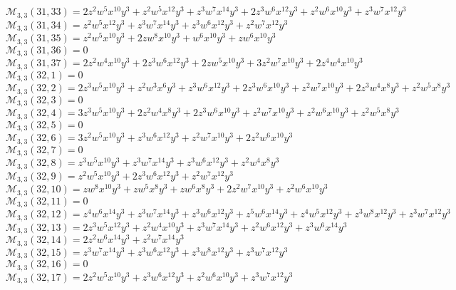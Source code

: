 $\mathcal{M}_{3,3}(31,33)=2z^2w^5x^{10}y^3+z^2w^5x^{12}y^3+z^3w^7x^{14}y^3+2z^3w^6x^{12}y^3+z^2w^6x^{10}y^3+z^3w^7x^{12}y^3$\\
$\mathcal{M}_{3,3}(31,34)=z^2w^5x^{12}y^3+z^3w^7x^{14}y^3+z^3w^6x^{12}y^3+z^2w^7x^{12}y^3$\\
$\mathcal{M}_{3,3}(31,35)=z^2w^5x^{10}y^3+2zw^8x^{10}y^3+w^6x^{10}y^3+zw^6x^{10}y^3$\\
$\mathcal{M}_{3,3}(31,36)=0$\\
$\mathcal{M}_{3,3}(31,37)=2z^2w^4x^{10}y^3+2z^3w^6x^{12}y^3+2zw^5x^{10}y^3+3z^2w^7x^{10}y^3+2z^4w^4x^{10}y^3$\\
$\mathcal{M}_{3,3}(32,1)=0$\\
$\mathcal{M}_{3,3}(32,2)=2z^3w^5x^{10}y^3+z^2w^3x^6y^3+z^3w^6x^{12}y^3+2z^3w^6x^{10}y^3+z^2w^7x^{10}y^3+2z^3w^4x^8y^3+z^2w^5x^8y^3$\\
$\mathcal{M}_{3,3}(32,3)=0$\\
$\mathcal{M}_{3,3}(32,4)=3z^3w^5x^{10}y^3+2z^2w^4x^8y^3+2z^3w^6x^{10}y^3+z^2w^7x^{10}y^3+z^2w^6x^{10}y^3+z^2w^5x^8y^3$\\
$\mathcal{M}_{3,3}(32,5)=0$\\
$\mathcal{M}_{3,3}(32,6)=3z^2w^5x^{10}y^3+z^3w^6x^{12}y^3+z^2w^7x^{10}y^3+2z^2w^6x^{10}y^3$\\
$\mathcal{M}_{3,3}(32,7)=0$\\
$\mathcal{M}_{3,3}(32,8)=z^3w^5x^{10}y^3+z^3w^7x^{14}y^3+z^3w^6x^{12}y^3+z^2w^4x^8y^3$\\
$\mathcal{M}_{3,3}(32,9)=z^2w^5x^{10}y^3+2z^3w^6x^{12}y^3+z^2w^7x^{12}y^3$\\
$\mathcal{M}_{3,3}(32,10)=zw^8x^{10}y^3+zw^5x^8y^3+zw^6x^8y^3+2z^2w^7x^{10}y^3+z^2w^6x^{10}y^3$\\
$\mathcal{M}_{3,3}(32,11)=0$\\
$\mathcal{M}_{3,3}(32,12)=z^4w^6x^{14}y^3+z^3w^7x^{14}y^3+z^3w^6x^{12}y^3+z^5w^6x^{14}y^3+z^4w^5x^{12}y^3+z^3w^8x^{12}y^3+z^3w^7x^{12}y^3$\\
$\mathcal{M}_{3,3}(32,13)=2z^3w^5x^{12}y^3+z^2w^4x^{10}y^3+z^3w^7x^{14}y^3+z^2w^6x^{12}y^3+z^3w^6x^{14}y^3$\\
$\mathcal{M}_{3,3}(32,14)=2z^2w^6x^{14}y^3+z^2w^7x^{14}y^3$\\
$\mathcal{M}_{3,3}(32,15)=z^3w^7x^{14}y^3+z^3w^6x^{12}y^3+z^3w^8x^{12}y^3+z^3w^7x^{12}y^3$\\
$\mathcal{M}_{3,3}(32,16)=0$\\
$\mathcal{M}_{3,3}(32,17)=2z^2w^5x^{10}y^3+z^3w^6x^{12}y^3+z^2w^6x^{10}y^3+z^3w^7x^{12}y^3$\\
